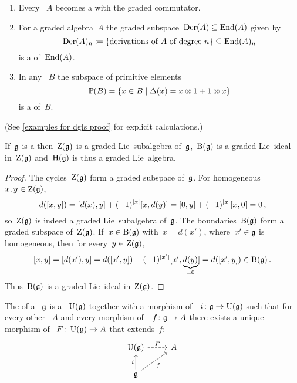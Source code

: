 \documentclass[a4paper,10pt,headings=standardclasses]{scrartcl}
\begin{document}
\begin{example}
  \label{examples for dgls}
  \leavevmode
  \begin{enumerate}
    \item
      Every {\dga}~$A$ becomes a {\dgl} with the graded commutator.
    \item
      For a graded algebra~$A$ the graded subspace~$\operatorname{Der}(A) \subseteq \operatorname{End}(A)$ given by
      \[
        \operatorname{Der}(A)_n
        \coloneqq
        \{
          \text{derivations of~$A$ of degree~$n$}
        \}
        \subseteq
        \operatorname{End}(A)_n
      \]
      is a {\dglsub} of~$\operatorname{End}(A)$.
    \item
      In any {\dgb}~$B$ the subspace of primitive elements
      \[
        \prim(B)
        =
        \{
          x \in B
        \suchthat
          \Delta(x) = x \tensor 1 + 1 \tensor x
        \}
      \]
      is a {\dglsub} of~$B$.
  \end{enumerate}
  (See \cref{examples for dgls proof} for explicit calculations.)
\end{example}

\begin{lemma}
  \label{homology of dgl}
  If~$\mathfrak{g}$ is a {\dgl} then~$\operatorname{Z}(\mathfrak{g})$ is a graded Lie~subalgebra of~$\mathfrak{g}$,~$\operatorname{B}(\mathfrak{g})$ is a graded Lie~ideal in~$\operatorname{Z}(\mathfrak{g})$ and~$\operatorname{H}(\mathfrak{g})$ is thus a graded Lie~algebra. 
\end{lemma}

\begin{proof}
  The cycles~$\operatorname{Z}(\mathfrak{g})$ form a graded subspace of~$\mathfrak{g}$.
  For homogeneous~$x, y \in \operatorname{Z}(\mathfrak{g})$,
  \[
    d([x,y])
    =
    [d(x), y] + (-1)^{\lvert x\rvert} [x, d(y)]
    =
    [0, y] + (-1)^{\lvert x\rvert} [x, 0]
    =
    0 \,,
  \]
  so~$\operatorname{Z}(\mathfrak{g})$ is indeed a graded Lie~subalgebra of~$\mathfrak{g}$.
  The boundaries~$\operatorname{B}(\mathfrak{g})$ form a graded subspace of~$\operatorname{Z}(\mathfrak{g})$.
  If~$x \in \operatorname{B}(\mathfrak{g})$ with~$x = d(x')$, where~$x' \in \mathfrak{g}$ is homogeneous, then for every~$y \in \operatorname{Z}(\mathfrak{g})$,
  \[
    [x,y]
    =
    [d(x'), y]
    =
    d([x',y]) - (-1)^{\lvert x'\rvert} [x', \underbrace{d(y)}_{=0}]
    =
    d([x',y])
    \in
    \operatorname{B}(\mathfrak{g}) \,.
  \]
  Thus~$\operatorname{B}(\mathfrak{g})$ is a graded Lie~ideal in~$\operatorname{Z}(\mathfrak{g})$.
\end{proof}

\begin{definition}
  The  of a {\dgl}~$\mathfrak{g}$ is a {\dga}~$\operatorname{U}(\mathfrak{g})$ together with a morphism of~{\dgls}~$i \colon \mathfrak{g} \to \operatorname{U}(\mathfrak{g})$ such that for every other {\dga}~$A$ and every morphism of~{\dgls}~$f \colon \mathfrak{g} \to A$ there exists a unique morphism of {\dgas}~$F \colon \operatorname{U}(\mathfrak{g}) \to A$ that extends~$f$:
  \[
    \begin{tikzcd}
      \Univ(\glie)
      \arrow[dashed]{r}[above]{F}
      &
      A
      \\
      \glie
      \arrow{u}[left]{i}
      \arrow{ur}[below right]{f}
      &
      {}
    \end{tikzcd}
  \]
\end{definition}
\end{document}
